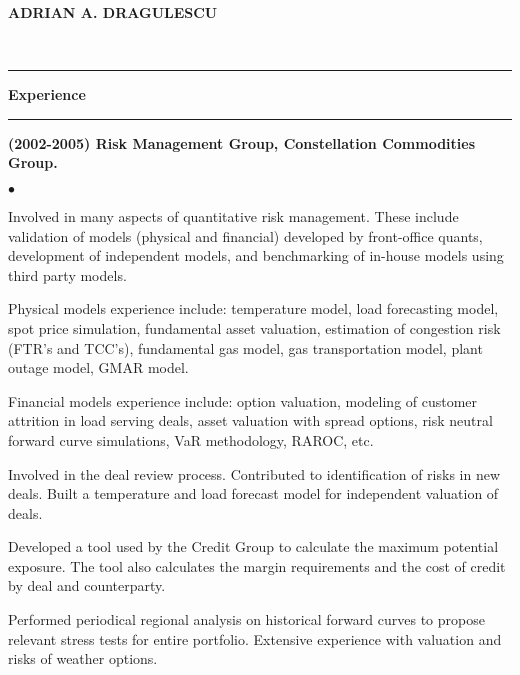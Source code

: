 \documentclass[12pt]{article}
\begin{document}
\begin{center}
   \Large {\bf{ADRIAN A. DRAGULESCU}}
\end{center}

\noindent
{}\\
\noindent
\rule{165mm}{1mm}

\vspace*{2pt}
\noindent
\large\textsf{\textbf {Experience}}

\vspace*{-8pt}
\noindent
\rule{165mm}{0.5mm}
\normalfont\normalsize

\noindent
{\bf (2002-2005) Risk Management Group, Constellation Commodities Group.} 
\begin{list}{$\bullet$}
   {\setlength{\itemsep}{0ex}
    \setlength{\parsep}{1ex}}
    \item Involved in many aspects of quantitative risk management.
    These include validation of models (physical and financial)
    developed by front-office quants, development of independent
    models, and benchmarking of in-house models using third party
    models.

    \item Physical models experience include: temperature model, load
    forecasting model, spot price simulation, fundamental asset
    valuation, estimation of congestion risk (FTR's and TCC's),
    fundamental gas model, gas transportation model, plant outage
    model, GMAR model.

    \item Financial models experience include: option valuation,
    modeling of customer attrition in load serving deals, asset
    valuation with spread options, risk neutral forward curve
    simulations, VaR methodology, RAROC, etc.

    \item Involved in the deal review process.  Contributed to
    identification of risks in new deals.  Built a temperature and
    load forecast model for independent valuation of deals.    

    \item Developed a tool used by the Credit Group to calculate the
    maximum potential exposure.  The tool also calculates the margin
    requirements and the cost of credit by deal and counterparty.

    \item Performed periodical regional analysis on historical forward
    curves to propose relevant stress tests for entire portfolio.
    Extensive experience with valuation and risks of weather options.
\end{list}
\end{document}
